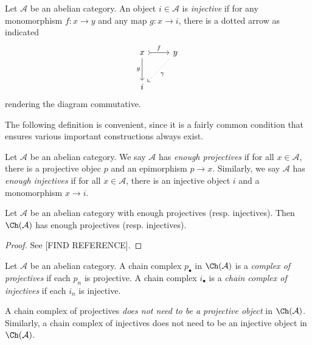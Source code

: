 \begin{definition}\label{6.3}
	Let $\mathcal{A} $ be an abelian category. An object $i\in \mathcal{A} $ is \emph{injective} if for any monomorphism $f : x \to y$ and any map $g : x \to i$, there is a dotted arrow as indicated
	\[\begin{tikzcd}[row sep = 2.5em, column sep = 2.5em]
	x \ar[" f ", tail, r] \ar[" g "', d]  & y \ar[" \gamma  ", dotted, dl]  \\
	i & 
	\end{tikzcd}\]
	rendering the diagram commutative.
\end{definition}

The following definition is convenient, since it is a fairly common condition that ensures various important constructions always exist.

\begin{definition}\label{6.4}
	Let $\mathcal{A} $ be an abelian category. We say $\mathcal{A} $ has \emph{enough projectives} if for all $x\in \mathcal{A} $, there is a projective objec $p$ and an epimorphism $p\to x$. Similarly, we say $\mathcal{A} $ has \emph{enough injectives} if for all $x\in \mathcal{A} $, there is an injective object $i$ and a monomorphism $x\to i$.
\end{definition}

\begin{proposition}\label{6.5}
	Let $\mathcal{A} $ be an abelian category with enough projectives (resp. injectives). Then $\Ch(\mathcal{A} ) $ has enough projectives (resp. injectives).
\end{proposition}
\begin{proof}
	See [FIND REFERENCE].
\end{proof}

\begin{definition}\label{6.6}
	Let $\mathcal{A} $ be an abelian category. A chain complex $p_{\bullet} $ in $\Ch(\mathcal{A} ) $ is a \emph{complex of projectives} if each $p_n$ is projective. A chain complex $i_{\bullet} $ is a \emph{chain complex of injectives} if each $i_n$ is injective.
\end{definition}

\begin{warning}\label{6.7}
	A chain complex of projectives \emph{does not need to be a projective object} in $\Ch(\mathcal{A} ) $. Similarly, a chain complex of injectives does not need to be an injective object in $\Ch(\mathcal{A} ) $.
\end{warning}

